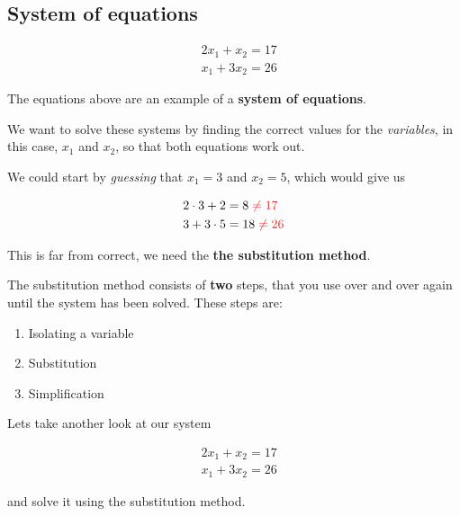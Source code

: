 \documentclass{article}
\begin{document}
\subsection{System of equations}

\begin{align*}
& 2x_1 + x_2 = 17\\
& x_1 + 3x_2 = 26
\end{align*}

The equations above are an example of a \textbf{system of equations}.

We want to solve these systems by finding the correct values for the \textit{variables}, in this case, $x_1$ and $x_2$, so that both equations work out.

We could start by \textit{guessing} that $x_1 = 3$ and $x_2 = 5$, which would give us 

\begin{align*}
& 2\cdot 3 + 2 = 8 \color{rooj} \neq 17\\
& \color{black} 3 + 3\cdot 5 = 18 \color{rooj} \neq 26 \color{black}
\end{align*}

This is far from correct, we need the \textbf{the substitution method}.

The substitution method consists of \textbf{two} steps, that you use over and over again until the system has been solved. These steps are:

\begin{enumerate}
\color{blou} \item Isolating a variable 
\color{rooj} \item Substitution 
\color{groen} \item Simplification
\end{enumerate}

Lets take another look at our system

\begin{align}
& 2x_1 + x_2 = 17\\ 
& x_1 + 3x_2 = 26 
\end{align}

and solve it using the substitution method.
\end{document}
